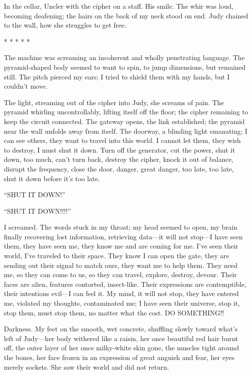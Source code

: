 \documentclass[
]{article}
\begin{document}
In the cellar, Uncler with the cipher on a staff. His smile. The whir
was loud, becoming deafening; the hairs on the back of my neck stood on
end. Judy chained to the wall, how she struggles to get free.

* * * * *

The machine was screaming an incoherent and wholly penetrating language.
The pyramid-shaped body seemed to want to spin, to jump dimensions, but
remained still. The pitch pierced my ears; I tried to shield them with
my hands, but I couldn't move.

The light, streaming out of the cipher into Judy, she screams of pain.
The pyramid whirling uncontrollably, lifting itself off the floor; the
cipher remaining to keep the circuit connected. The gateway opens, the
link established; the pyramid near the wall unfolds away from itself.
The doorway, a blinding light emanating; I can see others, they want to
travel into this world. I cannot let them, they wish to destroy, I must
shut it down. Turn off the generator, cut the power, shut it down, too
much, can't turn back, destroy the cipher, knock it out of balance,
disrupt the frequency, close the door, danger, great danger, too late,
too late, shut it down before it's too late.

``SHUT IT DOWN!''

``SHUT IT DOWN!!!!''

I screamed. The words stuck in my throat; my head seemed to open, my
brain finally recovering lost information, retrieving data---it will not
stop---I have seen them, they have seen me, they know me and are coming
for me. I've seen their world, I've traveled to their space. They know I
can open the gate, they are sending out their signal to match ours, they
want me to help them. They need me, so they can come to us, so they can
travel, explore, destroy, devour. Their faces are alien, features
contorted, insect-like. Their expressions are contemptible, their
intentions evil---I can feel it. My mind, it will not stop, they have
entered me, violated my thoughts, contaminated me; I have seen their
universe, stop it, stop them, must stop them, no matter what the cost.
DO SOMETHING!!

Darkness. My feet on the smooth, wet concrete, shuffling slowly toward
what's left of Judy---her body withered like a raisin, her once
beautiful red hair burnt off, the outer layer of her once milky-white
skin gone, the muscles tight around the bones, her face frozen in an
expression of great anguish and fear, her eyes merely sockets. She saw
their world and did not return.
\end{document}

